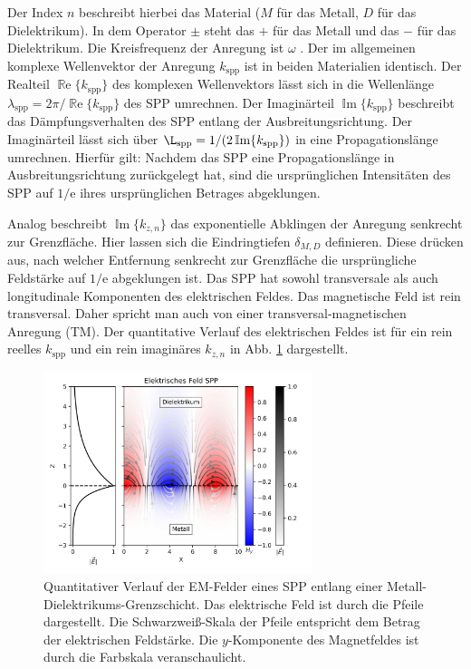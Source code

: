\documentclass[titlepage]{article}
\renewcommand{\Re}{\operatorname{\mathbb{R}e}}
\renewcommand{\Im}{\operatorname{\mathbb{I}m}}
\begin{document}
	Der Index $n$ beschreibt hierbei das Material ($M$ für das Metall, $D$ für das Dielektrikum). In dem Operator $\pm$ steht das $+$ für das Metall und das $-$ für das Dielektrikum. Die Kreisfrequenz der Anregung ist $\omega$ . Der im allgemeinen komplexe Wellenvektor der Anregung $k_{\mathrm{spp}}$ ist in beiden Materialien identisch. Der Realteil $\Re\{k_{\mathrm{spp}}\}$ des komplexen Wellenvektors lässt sich in die Wellenlänge $\lambda_{\mathrm{spp}} = 2\pi/ \Re\{k_{\mathrm{spp}}\} $ des SPP umrechnen. Der Imaginärteil $\Im\{k_{\mathrm{spp}}\}$ beschreibt das Dämpfungsverhalten des SPP entlang der Ausbreitungsrichtung. Der Imaginärteil lässt sich über $\L_{\mathrm{spp}} = 1/(2\Im\{k_{\mathrm{spp}}\})$ in eine Propagationslänge umrechnen.  Hierfür gilt: Nachdem das SPP eine Propagationslänge in Ausbreitungsrichtung zurückgelegt hat, sind die ursprünglichen Intensitäten des SPP auf $1/\mathrm{e}$ ihres ursprünglichen Betrages abgeklungen.
	
	Analog beschreibt $\Im\{k_{z, n}\}$ das exponentielle Abklingen der Anregung senkrecht zur Grenzfläche. Hier lassen sich die Eindringtiefen $\delta_{M,D}$ definieren. Diese drücken aus, nach welcher Entfernung senkrecht zur Grenzfläche die ursprüngliche Feldstärke auf $1/\mathrm{e}$ abgeklungen ist. Das SPP hat sowohl transversale als auch longitudinale Komponenten des elektrischen Feldes. Das magnetische Feld ist rein transversal. Daher spricht man auch von einer transversal-magnetischen Anregung (TM).
	Der quantitative Verlauf des elektrischen Feldes ist für ein rein reelles $k_{\mathrm{spp}}$ und ein rein imaginäres $k_{z, n}$ in Abb. \ref{fig:electric_field_spp} dargestellt.
	\begin{figure}[htbp] 
		\centering
		\includegraphics[width=0.7\textwidth]{figures/E_Feld_SPP.png}
		\caption[Elektrisches Feld SPP]{Quantitativer Verlauf der EM-Felder eines SPP entlang einer Metall-Dielektrikums-Grenzschicht. Das elektrische Feld ist durch die Pfeile dargestellt. Die Schwarzweiß-Skala der Pfeile entspricht dem Betrag der elektrischen Feldstärke. Die $y$-Komponente des Magnetfeldes ist durch die Farbskala veranschaulicht.}
		\label{fig:electric_field_spp}
	\end{figure}
	
\end{document}
